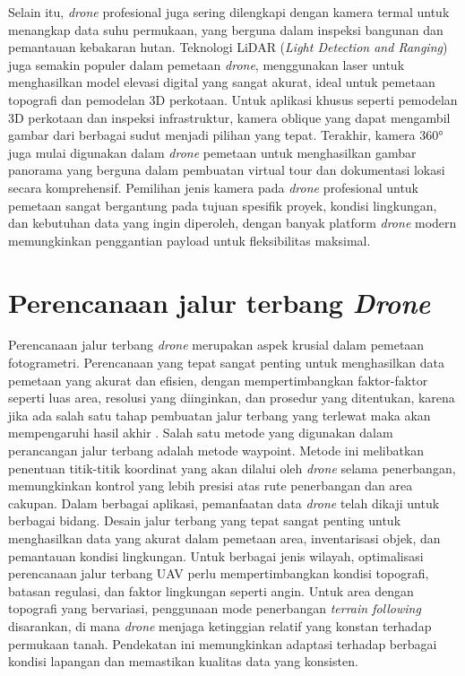 Selain itu, \textit{drone} profesional juga sering dilengkapi dengan kamera termal untuk menangkap data suhu permukaan, yang berguna dalam inspeksi bangunan dan pemantauan kebakaran hutan. Teknologi LiDAR (\textit{Light Detection and Ranging}) juga semakin populer dalam pemetaan \textit{drone}, menggunakan laser untuk menghasilkan model elevasi digital yang sangat akurat, ideal untuk pemetaan topografi dan pemodelan 3D perkotaan. Untuk aplikasi khusus seperti pemodelan 3D perkotaan dan inspeksi infrastruktur, kamera oblique yang dapat mengambil gambar dari berbagai sudut menjadi pilihan yang tepat. Terakhir, kamera 360° juga mulai digunakan dalam \textit{drone} pemetaan untuk menghasilkan gambar panorama yang berguna dalam pembuatan virtual tour dan dokumentasi lokasi secara komprehensif. Pemilihan jenis kamera pada \textit{drone} profesional untuk pemetaan sangat bergantung pada tujuan spesifik proyek, kondisi lingkungan, dan kebutuhan data yang ingin diperoleh, dengan banyak platform \textit{drone} modern memungkinkan penggantian payload untuk fleksibilitas maksimal.


\section{Perencanaan jalur terbang \textit{Drone}}

Perencanaan jalur terbang \textit{drone} merupakan aspek krusial dalam pemetaan fotogrametri. Perencanaan yang tepat sangat penting untuk menghasilkan data pemetaan yang akurat dan efisien, dengan mempertimbangkan faktor-faktor seperti luas area, resolusi yang diinginkan, dan prosedur yang ditentukan, karena jika ada salah satu tahap pembuatan jalur terbang yang terlewat maka akan mempengaruhi hasil akhir \citep{guntara2015perencanaan}. Salah satu metode yang digunakan dalam perancangan jalur terbang adalah metode waypoint. Metode ini melibatkan penentuan titik-titik koordinat yang akan dilalui oleh \textit{drone} selama penerbangan, memungkinkan kontrol yang lebih presisi atas rute penerbangan dan area cakupan. Dalam berbagai aplikasi, pemanfaatan data \textit{drone} telah dikaji untuk berbagai bidang. Desain jalur terbang yang tepat sangat penting untuk menghasilkan data yang akurat dalam pemetaan area, inventarisasi objek, dan pemantauan kondisi lingkungan. Untuk berbagai jenis wilayah, optimalisasi perencanaan jalur terbang UAV perlu mempertimbangkan kondisi topografi, batasan regulasi, dan faktor lingkungan seperti angin. Untuk area dengan topografi yang bervariasi, penggunaan mode penerbangan \textit{terrain following} disarankan, di mana \textit{drone} menjaga ketinggian relatif yang konstan terhadap permukaan tanah. Pendekatan ini memungkinkan adaptasi terhadap berbagai kondisi lapangan dan memastikan kualitas data yang konsisten.


